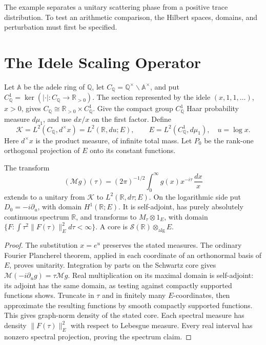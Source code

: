 The example separates a unitary scattering phase from a positive
trace distribution. To test an arithmetic comparison, the Hilbert
spaces, domains, and perturbation must first be specified.

\section{The Idele Scaling Operator}
\label{v4-arith:w7-j:framework}
\label{v4-arith:w7-j:framework:hilbert}

\begin{definition}
\label{v4-arith:w7-j:def:H-idele}
Let \(\mathbb A\) be the adele ring of \(\mathbb Q\), let
\(C_{\mathbb Q}=\mathbb Q^\times\backslash\mathbb A^\times\), and put
\(C_{\mathbb Q}^1=\ker(|\cdot|:C_{\mathbb Q}\to\mathbb R_{>0})\).
The section represented by the idele \((x,1,1,\ldots)\), \(x>0\),
gives \(C_{\mathbb Q}\cong\mathbb R_{>0}\times C_{\mathbb Q}^1\).
Give the compact group \(C_{\mathbb Q}^1\) Haar probability measure
\(d\mu_1\), and use \(dx/x\) on the first factor. Define
\begin{equation}
\label{v4-arith:w7-j:eq:H-idele}
 \mathcal K=L^2(C_{\mathbb Q},d^\times x)
 =L^2(\mathbb R,du;E),\qquad
 E=L^2(C_{\mathbb Q}^1,d\mu_1),\quad u=\log x.
\end{equation}
Here \(d^\times x\) is the product measure, of infinite total mass.
Let \(P_0\) be the rank-one orthogonal projection of \(E\) onto
its constant functions.
\end{definition}

\begin{lemma}
\label{v4-arith:w7-j:lem:mellin-decomp}
The transform
\begin{equation}
\label{v4-arith:w7-j:eq:mellin-decomp}
 (\mathcal Mg)(\tau)=(2\pi)^{-1/2}
 \int_0^\infty g(x)x^{-i\tau}\,\frac{dx}{x}
\end{equation}
extends to a unitary from \(\mathcal K\) to
\(L^2(\mathbb R,d\tau;E)\). On the logarithmic side put
\(D_0=-i\partial_u\), with domain \(H^1(\mathbb R;E)\).
It is self-adjoint, has purely absolutely continuous spectrum
\(\mathbb R\), and transforms to \(M_\tau\otimes1_E\), with domain
\(\{F:\int\tau^2\|F(\tau)\|_E^2d\tau<\infty\}\).
A core is \(\mathscr S(\mathbb R)\otimes_{\mathrm{alg}}E\).
\end{lemma}
\begin{proof}
The substitution \(x=e^u\) preserves the stated measures.
The ordinary Fourier Plancherel theorem, applied in each coordinate
of an orthonormal basis of \(E\), proves unitarity.
Integration by parts on the Schwartz core gives
\(\mathcal M(-i\partial_u g)=\tau\mathcal Mg\).
Real multiplication on its maximal domain is self-adjoint:
its adjoint has the same domain, as testing against compactly
supported functions shows. Truncate in \(\tau\) and in finitely many
\(E\)-coordinates, then approximate the resulting functions by smooth
compactly supported functions. This gives graph-norm density of the
stated core. Each spectral measure has density
\(\|F(\tau)\|_E^2\) with respect to Lebesgue measure. Every real
interval has nonzero spectral projection, proving the spectrum claim.
\end{proof}

